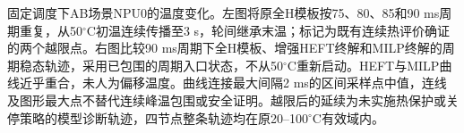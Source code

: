 \caption{固定调度下AB场景NPU0的温度变化。左图将原全H模板按75、80、85和90 ms周期重复，从50$^\circ$C初温连续传播至3 s，轮间继承末温；标记为既有连续热评价确证的两个越限点。右图比较90 ms周期下全H模板、增强HEFT终解和MILP终解的周期稳态轨迹，采用已包围的周期入口状态，不从50$^\circ$C重新启动。HEFT与MILP曲线近乎重合，未人为偏移温度。曲线连接最大间隔2 ms的区间采样点中值，连线及图形最大点不替代连续峰温包围或安全证明。越限后的延续为未实施热保护或关停策略的模型诊断轨迹，四节点整条轨迹均在原20–100$^\circ$C有效域内。}
